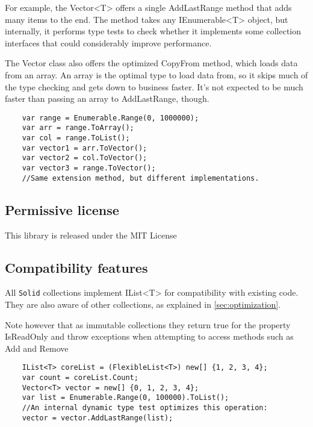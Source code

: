 \documentclass[]{article}
\newcommand{\codeformat}{\ttfamily}
\newcommand{\methodformat}{\codeformat\color{MidnightBlue}}
\newcommand{\interfaceformat}{\codeformat\color{ProcessBlue}}
\newcommand{\keywordformat}{\codeformat\color{blue}}
\newcommand{\keyword}[1]{{\keywordformat #1}}
\newcommand{\iface}[1]{{\interfaceformat #1}}
\newcommand{\method}[1]{{\methodformat #1}}
\newcommand{\solid}{\texttt{Solid}\xspace}
\begin{document}
For example, the Vector<T> offers a single AddLastRange method that adds many items to the end. The method takes any \iface{IEnumerable<T>} object, but internally, it performs type tests to check whether it implements some collection interfaces that could considerably improve performance. 

The Vector class also offers the optimized \method{CopyFrom} method, which loads data from an array. An array is the optimal type to load data from, so it skips much of the type checking and gets down to business faster. It's not expected to be much faster than passing an array to AddLastRange, though.

\begin{lstlisting}
	var range = Enumerable.Range(0, 1000000);
	var arr = range.ToArray();
	var col = range.ToList();
	var vector1 = arr.ToVector();
	var vector2 = col.ToVector();
	var vector3 = range.ToVector();
	//Same extension method, but different implementations.
\end{lstlisting}

\subsection{Permissive license}
This library is released under the MIT License 

\subsection{Compatibility features}\label{sec:compatibility}
All \solid collections implement IList<T> for compatibility with existing code. They are also aware of other collections, as explained in \cref{sec:optimization}.

Note however that as immutable collections they return \keyword{true} for the property IsReadOnly and throw exceptions when attempting to access methods such as \method{Add} and Remove

\begin{lstlisting}
	IList<T> coreList = (FlexibleList<T>) new[] {1, 2, 3, 4};
	var count = coreList.Count;
	Vector<T> vector = new[] {0, 1, 2, 3, 4};
	var list = Enumerable.Range(0, 100000).ToList();
	//An internal dynamic type test optimizes this operation:
	vector = vector.AddLastRange(list);
\end{lstlisting}
\end{document}
